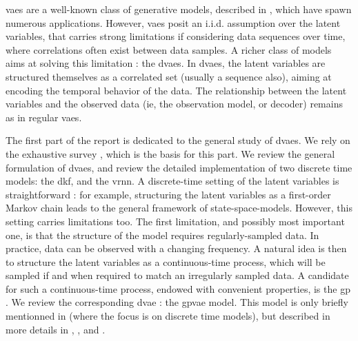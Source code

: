 

\glspl{vae} are a well-known class of generative models, described in \cite{kingma_introduction_2019}, which have spawn numerous applications. 
However, \glspl{vae} posit an i.i.d. assumption over the latent variables, that carries strong limitations if considering data sequences over time, 
where correlations often exist between data samples. A richer class of models aims at solving this limitation : the \glspl{dvae}.
In \glspl{dvae}, the latent variables are structured themselves as a correlated set (usually a sequence also), 
aiming at encoding the temporal behavior of the data. The relationship between the latent variables and the observed data (ie, the observation model,
or decoder) remains as in regular \glspl{vae}.

The first part of the report is dedicated to the general study of \glspl{dvae}. We rely on the exhaustive survey \cite{girin_dynamical_2022},
which is the basis for this part. We review the general formulation of \glspl{dvae}, and review the detailed implementation of two discrete time models:
 the \gls{dkf}, and the \gls{vrnn}. A discrete-time setting of the latent variables is straightforward : for example, 
 structuring the latent variables as a first-order Markov chain leads to the general framework of \glspl{state-space-model}.
 However, this setting carries limitations too. The first limitation, and possibly most important one, 
 is that the structure of the model requires regularly-sampled data. In practice, data can be observed with a changing frequency. 
 A natural idea is then to structure the latent variables as a continuous-time process, which will be sampled if and when 
 required to match an irregularly sampled data. A candidate for such a continuous-time process, endowed with convenient properties, 
 is the \gls{gp} \cite{rasmussen_gaussian_2008}. We review the corresponding \gls{dvae} : the \gls{gpvae} model.
 This model is only briefly mentionned in \cite{girin_dynamical_2022} (where the focus is on discrete time models), 
 but described in more details in \cite{casale_gaussian_2018}, \cite{fortuin_gp-vae:_2020}, \cite{titsias_bayesian_2010} 
 and \cite{zhu_markovian_2023}. 

